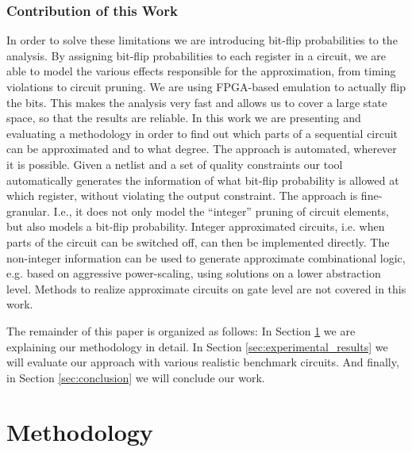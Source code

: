\documentclass[conference]{IEEEtran}
\begin{document}
\subsubsection*{Contribution of this Work}
In order to solve these limitations we are introducing bit-flip probabilities to the analysis. By assigning bit-flip probabilities to each register in a circuit, we are able to model the various effects responsible for the approximation, from timing violations to circuit pruning. We are using FPGA-based emulation to actually flip the bits. This makes the analysis very fast and allows us to cover a large state space, so that the results are reliable. In this work we are presenting and evaluating a methodology in order to find out which parts of a sequential circuit can be approximated and to what degree. The approach is automated, wherever it is possible. Given a netlist and a set of quality constraints our tool automatically generates the information of what bit-flip probability is allowed at which register, without violating the output constraint. The approach is fine-granular. I.e., it does not only model the ``integer'' pruning of circuit elements, but also models a bit-flip probability. Integer approximated circuits, i.e. when parts of the circuit can be switched off, can then be implemented directly. The non-integer information can be used to generate approximate combinational logic, e.g. based on aggressive power-scaling, using solutions on a lower abstraction level. Methods to realize approximate circuits on gate level are not covered in this work.

The remainder of this paper is organized as follows: In Section \ref{sec:methodology} we are explaining our methodology in detail. In Section \ref{sec:experimental_results} we will evaluate our approach with various realistic benchmark circuits. And finally, in Section \ref{sec:conclusion} we will conclude our work.



\section{Methodology}
\label{sec:methodology}
\end{document}
